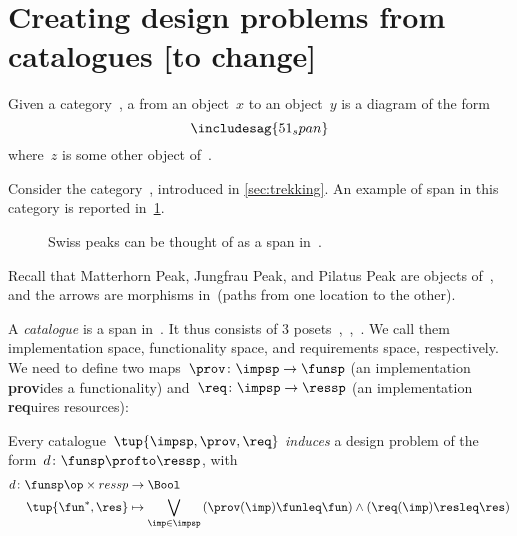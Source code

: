 

\section{Creating design problems from catalogues [to change]}
\label{sec:spans}

\begin{ctdefinition}[Span]
  \label{def:span}
  Given a category~\CatC, a \emph{} from an object~$x$ to an object~$y$ is a diagram of the form
  \begin{equation}
    \includesag{51_span}
  \end{equation}
  where~$z$ is some other object of~\CatC.
\end{ctdefinition}

\begin{example}
  Consider the category~\Berg, introduced in \cref{sec:trekking}. An example of span in this category is reported in~\cref{fig:exmountains}.
  \begin{figure}[h!]
    \begin{center}
    \end{center}
    \caption{Swiss peaks can be thought of as a span in~\Berg. \label{fig:exmountains}}
  \end{figure}
  Recall that \textsf{Matterhorn Peak}, \textsf{Jungfrau Peak}, and \textsf{Pilatus Peak} are objects of~\Berg, and the arrows are morphisms in~\Berg (paths from one location to the other).
\end{example}

\begin{definition}[Catalogue]
  \label{def:catalogue}
  A \emph{catalogue} is a span in~\Pos.
  It thus consists of 3 posets~\impsp,~\funsp,~\ressp.
  We call them implementation space, functionality space, and requirements space, respectively. We need to define two maps~$\prov \colon \impsp \to \funsp$ (an implementation \textbf{prov}ides a functionality) and~$\req\colon \impsp \to \ressp$ (an implementation \textbf{req}uires resources):
  \begin{center}
  \end{center}
\end{definition}

\begin{definition}
  Every catalogue~$\tup{\impsp,\prov,\req}$ \emph{induces} a design problem of the form~$d\colon \funsp \profto \ressp$, with
  \begin{equation*}
    \begin{aligned}
      d\colon \funsp \op \times ressp &\to \Bool\\
      \tup{\fun^*,\res}&\mapsto \bigvee_{\imp\in \impsp}\left(\prov(\imp)\funleq \fun \right)\wedge \left( \req(\imp)\resleq \res \right)
    \end{aligned}
  \end{equation*}
\end{definition}
